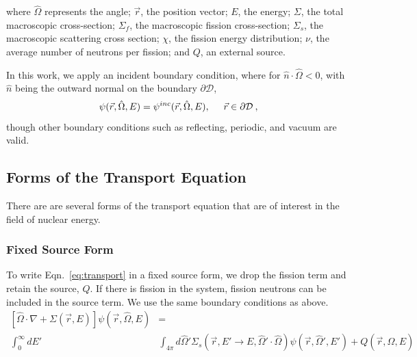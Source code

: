 where $\hat{\Omega}$ represents the angle; $\vec{r}$, the position vector; $E$, the energy; $\Sigma$, the total macroscopic cross-section; $\Sigma_f$, the macroscopic fission cross-section; $\Sigma_s$, the macroscopic scattering cross section; $\chi$, the fission energy distribution; $\nu$, the average number of neutrons per fission; and $Q$, an external source. 

In this work, we apply an incident boundary condition, where for $\hat{n} \cdot \hat{\Omega} < 0$, with $\hat{n}$ being the outward normal on the boundary $\partial \mathcal{D}$,
\begin{equation}
    \psi(\vec{r}, \hat{\Omega}, E) = \psi^{inc}(\vec{r}, \hat{\Omega}, E), \hspace{5mm} \vec{r} \in \partial \mathcal{D}\:,
\end{equation}
though other boundary conditions such as reflecting, periodic, and vacuum are valid.

\subsection{Forms of the Transport Equation}
There are are several forms of the transport equation that are of interest in the field of nuclear energy. 

\subsubsection{Fixed Source Form}
To write Eqn.~\eqref{eq:transport} in a fixed source form, we drop the fission term and retain the source, $Q$. If there is fission in the system, fission neutrons can be included in the source term. We use the same boundary conditions as above. 
%
\begin{equation}
\begin{split}
 [\hat{\Omega} \cdot \nabla + \Sigma(\vec{r}, E)]\psi(\vec{r}, \hat{\Omega}, E) &= \\ \int_0^\infty dE' &\int_{4\pi} d\hat{\Omega}' \Sigma_s(\vec{r}, E' \rightarrow E, \hat{\Omega}' \cdot \hat{\Omega})\psi(\vec{r}, \hat{\Omega}', E')  + Q(\vec{r}, \hat{\Omega}, E)
\end{split}
 \label{eq:transport_fixed_source}
\end{equation}

